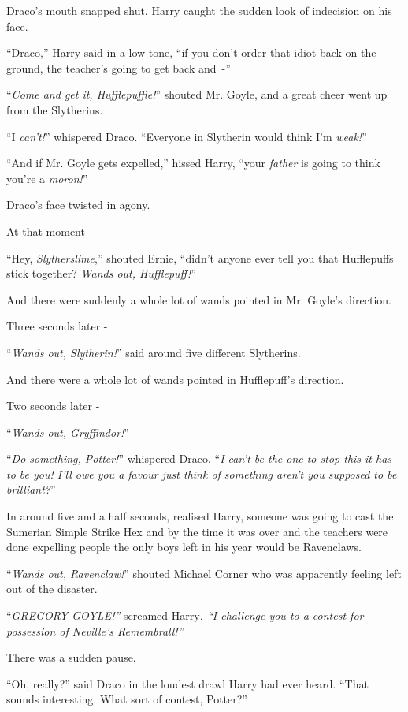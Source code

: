 Draco's mouth snapped shut. Harry caught the sudden look of indecision on his face.

``Draco,'' Harry said in a low tone, ``if you don't order that idiot back on the ground, the teacher's going to get back and~-''

``\emph{Come and get it, Hufflepuffle!}'' shouted Mr. Goyle, and a great cheer went up from the Slytherins.

``I \emph{can't!}'' whispered Draco. ``Everyone in Slytherin would think I'm \emph{weak!}''

``And if Mr. Goyle gets expelled,'' hissed Harry, ``your \emph{father} is going to think you're a \emph{moron!}''

Draco's face twisted in agony.

At that moment -

``Hey, \emph{Slytherslime},'' shouted Ernie, ``didn't anyone ever tell you that Hufflepuffs stick together? \emph{Wands out, Hufflepuff!}''

And there were suddenly a whole lot of wands pointed in Mr. Goyle's direction.

Three seconds later -

``\emph{Wands out, Slytherin!}'' said around five different Slytherins.

And there were a whole lot of wands pointed in Hufflepuff's direction.

Two seconds later -

``\emph{Wands out, Gryffindor!}''

``\emph{Do something, Potter!}'' whispered Draco. ``\emph{I can't be the one to stop this it has to be you! I'll owe you a favour just think of something aren't you supposed to be brilliant?}''

In around five and a half seconds, realised Harry, someone was going to cast the Sumerian Simple Strike Hex and by the time it was over and the teachers were done expelling people the only boys left in his year would be Ravenclaws.

``\emph{Wands out, Ravenclaw!}'' shouted Michael Corner who was apparently feeling left out of the disaster.

``\emph{GREGORY GOYLE!''} screamed Harry\emph{. ``I challenge you to a contest for possession of Neville's Remembrall!''}

There was a sudden pause.

``Oh, really?'' said Draco in the loudest drawl Harry had ever heard. ``That sounds interesting. What sort of contest, Potter?''

